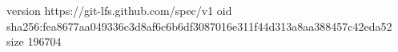 version https://git-lfs.github.com/spec/v1
oid sha256:fea8677aa049336c3d8af6c6b6df3087016e311f44d313a8aa388457c42eda52
size 196704
